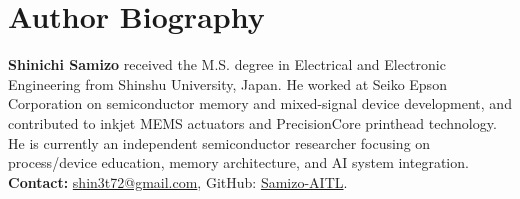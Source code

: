 \documentclass[conference]{IEEEtran}
\begin{document}
\section*{Author Biography}
\noindent\textbf{Shinichi Samizo} received the M.S. degree in Electrical and Electronic Engineering from Shinshu University, Japan. He worked at Seiko Epson Corporation on semiconductor memory and mixed-signal device development, and contributed to inkjet MEMS actuators and PrecisionCore printhead technology. He is currently an independent semiconductor researcher focusing on process/device education, memory architecture, and AI system integration.\\
\textbf{Contact:} \href{mailto:shin3t72@gmail.com}{shin3t72@gmail.com}, GitHub: \href{https://github.com/Samizo-AITL}{Samizo-AITL}.
\end{document}
